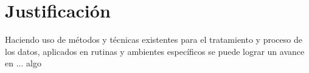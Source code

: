 \section{Justificación}

Haciendo uso de métodos y técnicas existentes para el tratamiento y proceso de los datos, aplicados en rutinas y ambientes específicos se puede lograr un avance en ... algo
